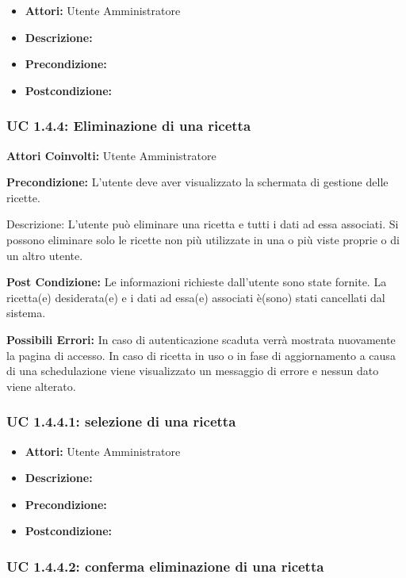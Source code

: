 \begin{itemize}
\item \textbf{Attori:} Utente Amministratore
\item \textbf{Descrizione:} 
\item \textbf{Precondizione:} 
\item \textbf{Postcondizione:} 
\end{itemize}

\subsubsection{UC 1.4.4: Eliminazione di una ricetta}

\textbf{Attori Coinvolti:}
Utente Amministratore

\textbf{Precondizione:}
L’utente deve aver visualizzato la schermata di gestione delle ricette.

Descrizione:
L’utente può eliminare una ricetta e tutti i dati ad essa associati.
Si possono eliminare solo le ricette non più utilizzate in una o più viste proprie o di un altro utente.    

\textbf{Post Condizione:}
Le informazioni richieste dall'utente sono state fornite.
La ricetta(e) desiderata(e) e i dati ad essa(e) associati è(sono) stati cancellati dal sistema.

\textbf{Possibili Errori:}
In caso di autenticazione scaduta verrà mostrata nuovamente la pagina di accesso.
In caso di ricetta in uso o in fase di aggiornamento a causa di una schedulazione viene visualizzato un messaggio di errore e nessun dato viene alterato.

\subsubsection{UC 1.4.4.1: selezione di una ricetta}

\begin{itemize}
\item \textbf{Attori:} Utente Amministratore
\item \textbf{Descrizione:} 
\item \textbf{Precondizione:} 
\item \textbf{Postcondizione:} 
\end{itemize}

\subsubsection{UC 1.4.4.2: conferma eliminazione di una ricetta}

